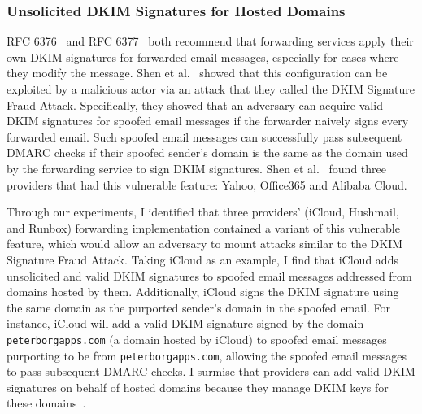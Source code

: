\subsubsection{Unsolicited DKIM Signatures for Hosted Domains}
\label{subsubsec:unsolicited_dkim}
RFC 6376~\cite{rfc6376} and RFC 6377~\cite{rfc6377} both recommend that
forwarding services apply their own DKIM signatures for forwarded email
messages, especially for cases where they modify the message. 
Shen et al.~\cite{shen2020weak} showed that this configuration can be exploited
by a malicious actor via an attack that they called the DKIM Signature Fraud
Attack.  Specifically, they showed that an adversary can acquire valid DKIM
signatures for spoofed email messages if the forwarder naively signs every
forwarded email. Such spoofed email messages can successfully pass subsequent
DMARC checks if their spoofed sender's domain is the same as the domain used by
the forwarding service to sign DKIM signatures. Shen et al.~\cite{shen2020weak}
found three providers that had this vulnerable feature: Yahoo, Office365 and
Alibaba Cloud.

Through our experiments, I identified that three providers' (iCloud, Hushmail, and Runbox) forwarding implementation contained a variant of this vulnerable feature, which would allow an adversary to mount attacks similar to the DKIM Signature Fraud Attack.
Taking iCloud as an example, I find that iCloud adds unsolicited and valid DKIM signatures to spoofed email messages addressed from domains hosted by them. Additionally,
iCloud signs the DKIM signature using the same domain as the purported sender's domain in the spoofed email. For instance, iCloud will add a valid DKIM signature signed by the domain \texttt{peterborgapps.com} (a domain hosted by iCloud) to spoofed email messages purporting to be from \texttt{peterborgapps.com}, allowing the spoofed email messages to pass subsequent DMARC checks.
I surmise that providers can add valid DKIM signatures on behalf of hosted domains because they manage DKIM keys for these domains~\cite{Setupane66:online, HushDKIM}.





